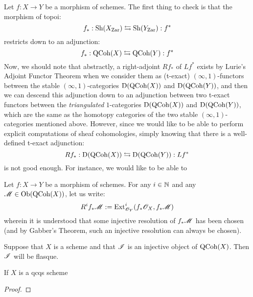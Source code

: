            Let $f: X \to Y$ be a morphism of schemes. The first thing to check is that the morphism of topoi:
                $$f_*: \mathrm{Sh}(X_{\mathrm{Zar}}) \leftrightarrows \mathrm{Sh}(Y_{\mathrm{Zar}}): f^*$$
            restricts down to an adjunction:
                $$f_*: \mathrm{QCoh}(X) \leftrightarrows \mathrm{QCoh}(Y): f^*$$
            Now, we should note that abstractly, a right-adjoint $Rf_*$ of $Lf^*$ exists by Lurie's Adjoint Functor Theorem when we consider them as (t-exact) $(\infty, 1)$-functors between the stable $(\infty, 1)$-categories $\mathrm{D}(\mathrm{QCoh}(X))$ and $\mathrm{D}(\mathrm{QCoh}(Y))$, and then we can descend this adjunction down to an adjunction between two t-exact functors between the \textit{triangulated} $1$-categories $\mathrm{D}(\mathrm{QCoh}(X))$ and $\mathrm{D}(\mathrm{QCoh}(Y))$, which are the same as the homotopy categories of the two stable $(\infty, 1)$-categories mentioned above. However, since we would like to be able to perform explicit computations of sheaf cohomologies, simply knowing that there is a well-defined t-exact adjunction:
                $$Rf_*: \mathrm{D}(\mathrm{QCoh}(X)) \leftrightarrows \mathrm{D}(\mathrm{QCoh}(Y)): Lf^*$$
            is not good enough. For instance, we would like to be able to 
            \begin{convention}
                Let $f: X \to Y$ be a morphism of schemes. For any $i \in \mathbb{N}$ and any $\mathscr{M} \in \mathrm{Ob}(\mathrm{QCoh}(X))$, let us write:
                    $$R^if_*\mathscr{M} := \mathrm{Ext}^i_{\mathscr{O}_Y}(f_*\mathscr{O}_X, f_*\mathscr{M})$$
                wherein it is understood that some injective resolution of $f_*\mathscr{M}$ has been chosen (and by Gabber's Theorem, such an injective resolution can always be chosen).
            \end{convention}
            \begin{lemma} \label{lemma: injective_quasi_coherent_modules_over_locally_noetherian_schemes_are_flasque}
                Suppose that $X$ is a scheme and that $\mathscr{I}$ is an injective object of $\mathrm{QCoh}(X)$. Then $\mathscr{I}$ will be flasque. 
            \end{lemma}
            \begin{theorem} \label{theorem: absolute_serre_affineness_criterion}
                If $X$ is a qcqs scheme
            \end{theorem}
                \begin{proof}
                    
                \end{proof}
            \begin{theorem} \label{theorem: theorem: relative_serre_affineness_criterion}
                
            \end{theorem}

